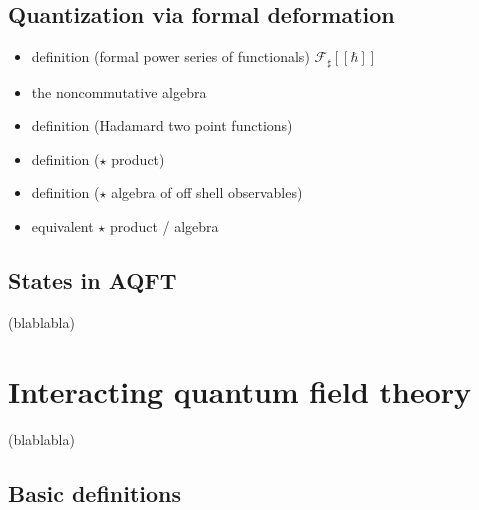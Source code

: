 \documentclass[10pt]{book}
\newcommand{\Fcal}{\mathcal{F}}
\newcommand{\Fsf}{\mathsf{F}}
\theoremstyle{break}
\begin{document}


\section{Quantization via formal deformation}


\begin{itemize}
\item definition (formal power series of functionals) $\Fcal_\sharp[[\hbar]]$
\item the noncommutative algebra
\item definition (Hadamard two point functions)
\item definition ($\star$ product)
\item definition ($\star$ algebra of off shell observables)
\item equivalent $\star$ product / algebra
\end{itemize}


\section{States in AQFT}


(blablabla)


\chapter{Interacting quantum field theory}


(blablabla)


\section{Basic definitions}
\end{document}
